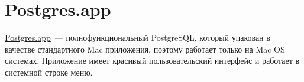 \section{Postgres.app}

\href{http://postgresapp.com/}{Postgres.app}~--- полнофункциональный PostgreSQL, который упакован в качестве стандартного Mac приложения, поэтому работает только на Mac OS системах. Приложение имеет красивый пользовательский интерфейс и работает в системной строке меню.
